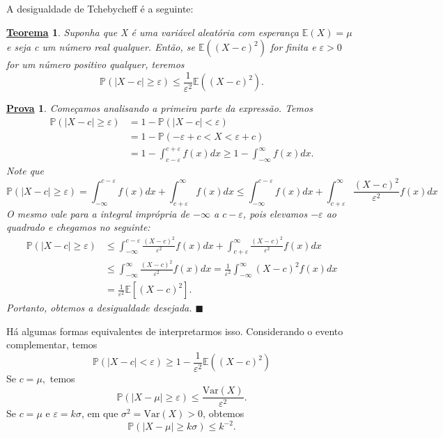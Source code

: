 \documentclass{article}
\newtheorem*{theorem*}{\underline{Teorema}}
\newtheorem*{proof*}{\underline{Prova}}
\renewcommand\qedsymbol{$\blacksquare$}
\begin{document}
A desigualdade de Tchebycheff é a seguinte: 
\begin{theorem*}
  Suponha que X é uma variável aleatória
  com esperança \(\mathbb{E}(X) = \mu\) e seja c um número real qualquer. Então, se \(\mathbb{E}((X-c)^{2})\)
  for finita e \(\varepsilon >0\) for um número positivo qualquer, teremos 
  \[
    \mathbb{P}(|X-c|\geq \varepsilon )\leq \frac{1}{\varepsilon ^{2}}\mathbb{E}((X-c)^{2}).
  \]
\end{theorem*}
\begin{proof*}
  Começamos analisando a primeira parte da expressão. Temos
  \begin{align*}
    \mathbb{P}(|X-c|\geq \varepsilon )& = 1 - \mathbb{P}(|X-c| < \varepsilon )\\
                                      & = 1 - \mathbb{P}(-\varepsilon + c < X < \varepsilon + c)\\
                                      & = 1 - \int_{c-\varepsilon }^{c+\varepsilon }f(x)dx\geq 1 - \int_{-\infty}^{\infty}f(x)dx.
  \end{align*}
  Note que  
  \[
    \mathbb{P}(|X-c|\geq \varepsilon ) = \int_{-\infty}^{c-\varepsilon }f(x)dx + \int_{c+\varepsilon }^{\infty}f(x)dx\leq \int_{-\infty}^{c-\varepsilon }f(x)dx + \int_{c+\varepsilon }^{\infty}\frac{(X-c)^{2}}{\varepsilon ^{2}}f(x)dx
  \]
  O mesmo vale para a integral imprópria de \(-\infty\) a \(c-\varepsilon \), pois elevamos \(-\varepsilon \) ao quadrado e chegamos no seguinte:
  \begin{align*}
    \mathbb{P}(|X-c|\geq \varepsilon )&\leq \int_{-\infty}^{c-\varepsilon }\frac{(X-c)^{2}}{\varepsilon ^{2}}f(x)dx + \int_{c+\varepsilon }^{\infty}\frac{(X-c)^{2}}{\varepsilon ^{2}}f(x)dx\\
                                      &\leq \int_{-\infty}^{\infty}\frac{(X-c)^{2}}{\varepsilon ^{2}}f(x)dx = \frac{1}{\varepsilon ^{2}}\int_{-\infty}^{\infty}(X-c)^{2}f(x)dx\\
                                      &= \frac{1}{\varepsilon ^{2}}\mathbb{E}[(X-c)^{2}].
  \end{align*}
  Portanto, obtemos a desigualdade desejada. \qedsymbol
\end{proof*}
Há algumas formas equivalentes de interpretarmos isso. 
Considerando o evento complementar, temos 
\[
  \mathbb{P}(|X-c|< \varepsilon )\geq 1 - \frac{1}{\varepsilon ^{2}}\mathbb{E}((X-c)^{2})
\]
Se \(c = \mu,\) temos 
\[
  \mathbb{P}(|X-\mu|\geq \varepsilon )\leq \frac{\mathrm{Var}(X)}{\varepsilon ^{2}}.
\]
Se \(c=\mu\) e \(\varepsilon = k\sigma \), em que \(\sigma ^{2}=\mathrm{Var}(X) > 0\), obtemos 
\[
  \mathbb{P}(|X-\mu|\geq k\sigma )\leq k^{-2}.
\]
\end{document}

